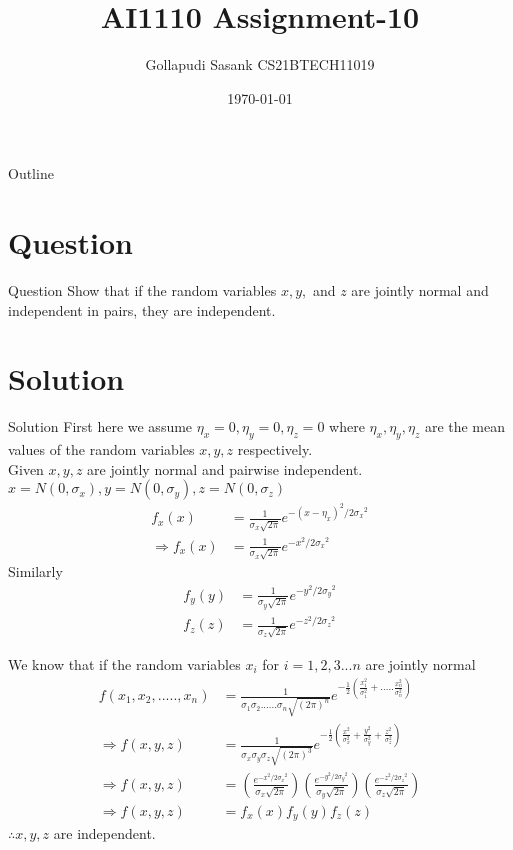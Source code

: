 \documentclass{beamer}
\title{AI1110 Assignment-10}
\author{Gollapudi Sasank CS21BTECH11019}
\date{\today}
\providecommand{\brak}[1]{\ensuremath{\left(#1\right)}}
\begin{document}
\begin{frame}
    \titlepage 
\end{frame}

\logo{}


\begin{frame}{Outline}
    \tableofcontents
\end{frame}


\section{Question}
\begin{frame}{Question}
Show that if the random variables $x,y,$ and $z$ are jointly normal and independent in pairs, they are independent.
\end{frame}

\section{Solution}
\begin{frame}{Solution}
First here we assume $\eta_x = 0 ,\eta_y = 0 ,\eta_z = 0 $ where $\eta_x,\eta_y,\eta_z$ are the mean values of the random variables $x,y,z$ respectively.\\
Given $x,y,z$ are jointly normal and pairwise independent.\\
$x = N(0,\sigma_x) , y = N(0,\sigma_y) , z = N(0,\sigma_z)$\\
\begin{align}
f_x(x) &= \frac{1}{\sigma_x\sqrt{2\pi}} e^{-{(x-\eta_x)}^{2}/2        {\sigma_x}^{2}} \\
\Rightarrow f_x(x) &= \frac{1}{\sigma_x\sqrt{2\pi}} e^{-x^{2}/2{\sigma_x}^{2}} 
\end{align}
Similarly 
\begin{align}
f_y(y) &= \frac{1}{\sigma_y\sqrt{2\pi}} e^{-y^{2}/2{\sigma_y}^{2}} \\
f_z(z) &= \frac{1}{\sigma_z\sqrt{2\pi}} e^{-z^{2}/2{\sigma_z}^{2}}
\end{align}
\end{frame}

\begin{frame}
We know that if the random variables $x_i$ for $i = 1,2,3...n$ are jointly normal 
\begin{align}
f(x_1,x_2,.....,x_n) &= \frac{1}{\sigma_1\sigma_2......\sigma_n \sqrt{{(2\pi)}^n}} e^{{-\frac{1}{2} \brak{\frac{x_1^2}{\sigma_1^2} +..... \frac{x_n^2}{\sigma_n^2} } }} \\
\Rightarrow f(x,y,z) &= \frac{1}{\sigma_x\sigma_y\sigma_z \sqrt{{(2\pi)}^3}} e^{-\frac{1}{2} \brak{ \frac{x^2}{\sigma_x^2} + \frac{y^2}{\sigma_y^2} + \frac{z^2}{\sigma_z^2} } } \\ 
\Rightarrow f(x,y,z) &= \brak{\frac{e^{-x^{2}/2{\sigma_x}^{2}}}{\sigma_x\sqrt{2\pi}}} \brak{\frac{e^{-y^{2}/2{\sigma_y}^{2}}}{\sigma_y\sqrt{2\pi}}} \brak{\frac{e^{-z^{2}/2{\sigma_z}^{2}}}{\sigma_z\sqrt{2\pi}}} \\
\Rightarrow f(x,y,z) &= f_x(x) f_y(y) f_z(z)
\end{align}
$\therefore x,y,z$ are independent.
\end{frame}
\end{document}
